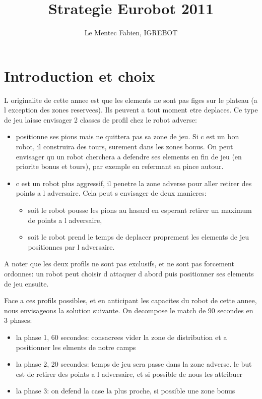 \documentclass[a4paper, 11pt]{article}
\begin{document}
\title{Strategie Eurobot 2011}
\author{Le Mentec Fabien, IGREBOT}
\date{} 

\maketitle

\tableofcontents

\newpage
\section{Introduction et choix}
L originalite de cette annee est que les elements ne sont pas
figes sur le plateau (a l exception des zones reservees). Ils
peuvent a tout moment etre deplaces. Ce type de jeu laisse
envisager 2 classes de profil chez le robot adverse:
\begin{itemize}
\item
  positionne ses pions mais ne quittera pas sa zone de jeu.
  Si c est un bon robot, il construira des tours, surement dans les
  zones bonus. On peut envisager qu un robot cherchera a defendre
  ses elements en fin de jeu (en priorite bonus et tours), par
  exemple en refermant sa pince autour.
\item
  c est un robot plus aggressif, il penetre la zone adverse pour
  aller retirer des points a l adversaire. Cela peut s envisager
  de deux manieres:
   \begin{itemize}
   \item soit le robot pousse les pions au hasard en esperant retirer
     un maximum de points a l adversaire,
   \item soit le robot prend le temps de deplacer proprement les elements
     de jeu positionnes par l adversaire.
   \end{itemize}
\end{itemize}

A noter que les deux profils ne sont pas exclusifs, et ne sont pas
forcement ordonnes: un robot peut choisir d attaquer d abord puis
positionner ses elements de jeu ensuite.

Face a ces profils possibles, et en anticipant les capacites du
robot de cette annee, nous envisageons la solution suivante. On
decompose le match de 90 secondes en 3 phases:
\begin{itemize}
  \item la phase 1, 60 secondes: consacrees  vider la zone de distribution et
    a positionner les elments de notre camps
  \item la phase 2, 20 secondes: temps de jeu sera passe dans la zone adverse.
    le but est de retirer des points a l adversaire, et si possible de nous les
    attribuer
  \item  la phase 3: on defend la case la plus proche, si possible une zone bonus
\end{itemize}
\end{document}
